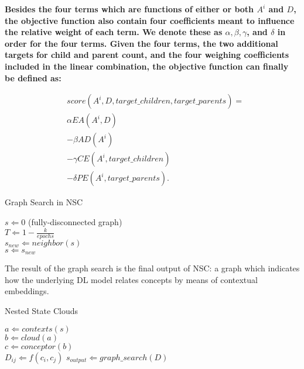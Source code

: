 \textbf{Besides the four terms which are functions of either or both $A^i$ and $D$, the objective function also contain four coefficients meant to influence the relative weight of each term. We denote these as $\alpha, \beta, \gamma$, and $\delta$ in order for the four terms. Given the four terms, the two additional targets for child and parent count, and the four weighing coefficients included in the linear combination, the objective function can finally be defined as:}

\begin{align*}
    & score(A^i, D, target\_children, target\_parents) = \\
    & \alpha EA(A^i, D) \\
    & - \beta AD(A^i) \\
    & - \gamma CE(A^i, target\_children) \\
    & - \delta PE(A^i, target\_parents).
\end{align*}

\begin{algorithm}[!tbp] 
    \caption{Graph Search in NSC}
    \label{alg:gs}
    \begin{algorithmic}
        \STATE $s \Leftarrow 0 $ (fully-disconnected graph) \\
        \STATE $T \Leftarrow 1 - \frac{k}{epochs}$ \\
        \STATE $s_{new} \Leftarrow neighbor(s)$ \\
            \STATE $s \Leftarrow s_{new}$
        \ENDIF
        \ENDFOR
    \end{algorithmic}
\end{algorithm}

The result of the graph search is the final output of NSC: a graph which indicates how the underlying DL model relates concepts by means of contextual embeddings.

\begin{algorithm}[!tbp] 
    \caption{Nested State Clouds}
    \label{alg:gs}
    \begin{algorithmic}
            \STATE $a \Leftarrow contexts(s)$ \\
            \STATE $b \Leftarrow cloud(a)$ \\
            \STATE $c \Leftarrow conceptor(b)$ \\
        \ENDFOR
                \STATE $D_{ij} \Leftarrow f(c_i, c_j)$
            \ENDFOR
        \ENDFOR
        \STATE $s_{output} \Leftarrow graph\_search(D)$
    \end{algorithmic}
\end{algorithm}

